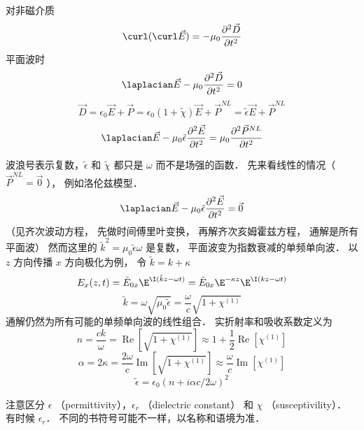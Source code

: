 
对非磁介质
\begin{equation}
  \curl (\curl \vec E) =  - {\mu _0}\frac{{{\partial ^2}\vec D}}{{\partial {t^2}}}
 \end{equation}
平面波时
 \begin{equation}
  {\laplacian}\vec E - {\mu _0}\frac{{{\partial ^2}\vec D}}{{\partial {t^2}}} = 0
 \end{equation}
 \begin{equation}
\vec D = {\epsilon _0}\vec E + \vec P = {\epsilon _0}(1 + \tilde \chi )\vec E + {\vec P^{NL}} = \tilde \epsilon \vec E + {\vec P^{NL}}
 \end{equation}
 \begin{equation}
{\laplacian}\vec E - {\mu _0}\tilde \epsilon \frac{{{\partial ^2}\vec E}}{{\partial {t^2}}} = {\mu _0}\frac{{{\partial ^2}{{\vec P}^{NL}}}}{{\partial {t^2}}}
 \end{equation}
 
波浪号表示复数，$\tilde \epsilon$ 和 $\tilde \chi $ 都只是 $\omega $ 而不是场强的函数． 先来看线性的情况（ ${\vec P^{NL}} = \vec 0$ ）， 例如洛伦兹模型．
\begin{equation}
{\laplacian}\vec E - {\mu _0}\tilde \epsilon \frac{{{\partial ^2}\vec E}}{{\partial {t^2}}} = \vec 0
 \end{equation}
（见齐次波动方程， 先做时间傅里叶变换， 再解齐次亥姆霍兹方程， 通解是所有平面波） 然而这里的 ${\tilde k^2} = {\mu _0}\tilde \epsilon \omega$ 是复数， 平面波变为指数衰减的单频单向波． 以 $z$ 方向传播 $x$ 方向极化为例， 令  $\tilde k = k + \kappa $ 
\begin{equation}
{E_x}(z,t) = {\tilde E_{0x}}{\E^{\I(\tilde kz - \omega t)}} = {\tilde E_{0x}}{\E^{ - \kappa z}}{\E^{\I(kz - \omega t)}}
\end{equation}
\begin{equation}
\tilde k = \omega \sqrt {{\mu _0}\tilde \epsilon }  = \frac{\omega }{c}\sqrt {1 + {\chi ^{(1)}}}
\end{equation}
通解仍然为所有可能的单频单向波的线性组合． 实折射率和吸收系数定义为
\begin{equation}
n = \frac{{ck}}{\omega } = \operatorname{Re} \left[ {\sqrt {1 + {\chi ^{(1)}}} } \right] \approx 1 + \frac{1}{2}\operatorname{Re} [{\chi ^{(1)}}]
\end{equation}
\begin{equation}
\alpha  = 2\kappa  = \frac{{2\omega }}{c}\operatorname{Im} \left[ {\sqrt {1 + {\chi ^{(1)}}} } \right] \approx \frac{\omega }{c}\operatorname{Im} [{\chi ^{(1)}}]
\end{equation}
\begin{equation}
\tilde \epsilon  = {\epsilon _0}{(n + i\alpha c/2\omega )^2}
\end{equation}
 
注意区分 $\epsilon$ 
（permittivity），${\epsilon _r}$ （dielectric constant） 和 $\chi $ （susceptivility）． 有时候 ${\epsilon _r}$． 不同的书符号可能不一样，以名称和语境为准．

